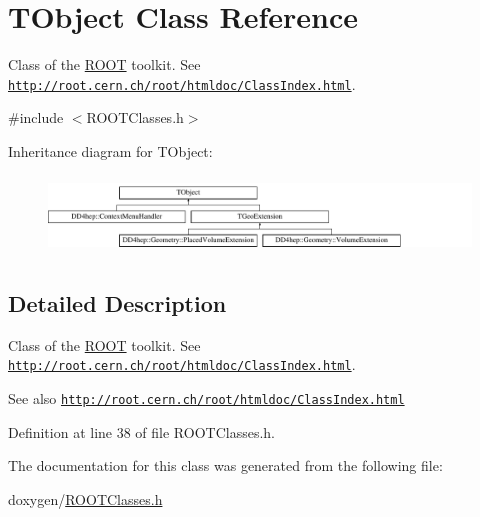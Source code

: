 \hypertarget{class_t_object}{}\section{T\+Object Class Reference}
\label{class_t_object}


Class of the \hyperlink{namespace_r_o_o_t}{R\+O\+OT} toolkit. See \href{http://root.cern.ch/root/htmldoc/ClassIndex.html}{\tt http\+://root.\+cern.\+ch/root/htmldoc/\+Class\+Index.\+html}.  




{\ttfamily \#include $<$R\+O\+O\+T\+Classes.\+h$>$}

Inheritance diagram for T\+Object\+:\begin{figure}[H]
\begin{center}
\leavevmode
\includegraphics[height=2.097378cm]{class_t_object}
\end{center}
\end{figure}


\subsection{Detailed Description}
Class of the \hyperlink{namespace_r_o_o_t}{R\+O\+OT} toolkit. See \href{http://root.cern.ch/root/htmldoc/ClassIndex.html}{\tt http\+://root.\+cern.\+ch/root/htmldoc/\+Class\+Index.\+html}. 

\begin{DoxySeeAlso}{See also}
\href{http://root.cern.ch/root/htmldoc/ClassIndex.html}{\tt http\+://root.\+cern.\+ch/root/htmldoc/\+Class\+Index.\+html} 
\end{DoxySeeAlso}


Definition at line 38 of file R\+O\+O\+T\+Classes.\+h.



The documentation for this class was generated from the following file\+:\begin{DoxyCompactItemize}
\item 
doxygen/\hyperlink{_r_o_o_t_classes_8h}{R\+O\+O\+T\+Classes.\+h}\end{DoxyCompactItemize}
